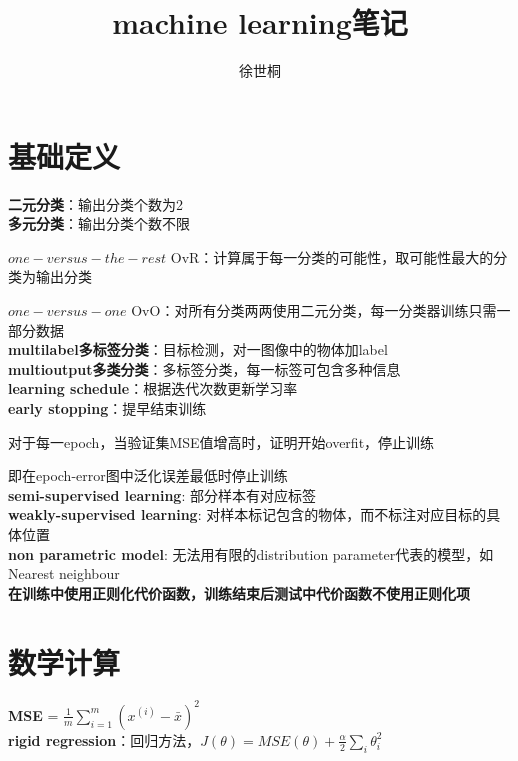\documentclass[UTF8]{ctexart}
\title{machine learning笔记}
\author{徐世桐}
\date{}
\begin{document}
\maketitle

\section{基础定义}
\noindent \textbf{二元分类}：输出分类个数为2\\
\textbf{多元分类}：输出分类个数不限

  $one-versus-the-rest$ OvR：计算属于每一分类的可能性，取可能性最大的分类为输出分类

  $one-versus-one$ OvO：对所有分类两两使用二元分类，每一分类器训练只需一部分数据\\
\textbf{multilabel多标签分类}：目标检测，对一图像中的物体加label\\
\textbf{multioutput多类分类}：多标签分类，每一标签可包含多种信息\\
\textbf{learning schedule}：根据迭代次数更新学习率\\
\textbf{early stopping}：提早结束训练

  对于每一epoch，当验证集MSE值增高时，证明开始overfit，停止训练

  即在epoch-error图中泛化误差最低时停止训练\\
\textbf{semi-supervised learning}: 部分样本有对应标签\\
\textbf{weakly-supervised learning}: 对样本标记包含的物体，而不标注对应目标的具体位置\\
\textbf{non parametric model}: 无法用有限的distribution parameter代表的模型，如Nearest neighbour\\
\textbf{在训练中使用正则化代价函数，训练结束后测试中代价函数不使用正则化项}

\section{数学计算}
\noindent \textbf{MSE} = $\frac{1}{m}\sum_{i=1}^{m}(x^{(i)} - \bar{x} )^2$\\
\textbf{rigid regression}：回归方法，$J(\theta) = MSE(\theta) + \frac{\alpha}{2}\sum_{i}\theta_i^2$
\end{document}
